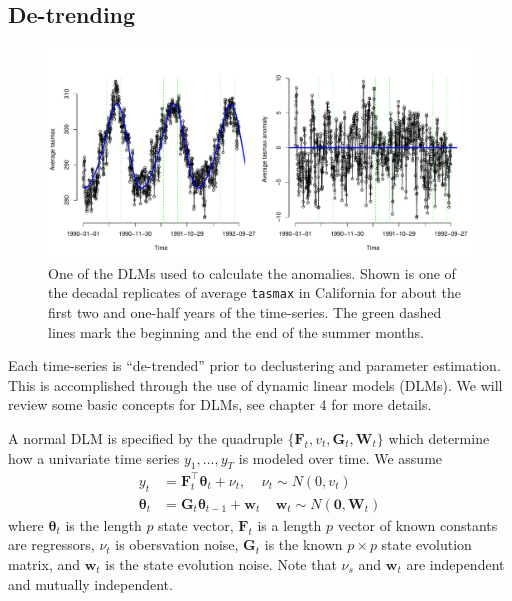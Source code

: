 \documentclass[12pt]{article}
\newcommand{\m}[1]{\mathbf{\bm{#1}}}
\begin{document}
\subsection{De-trending}
\label{anomaly}

\begin{figure}
\begin{center}
\includegraphics[scale=0.50]{figs/dlm.pdf}
\end{center}
\caption{One of the DLMs used to calculate the anomalies. Shown is one of the decadal replicates of average \texttt{tasmax} in California for about the first two and one-half years of the time-series. The green dashed lines mark the beginning and the end of the summer months.}
\label{dlm}
\end{figure}

Each time-series is ``de-trended'' prior to declustering and parameter estimation. This is accomplished through the use of dynamic linear models (DLMs). We will review some basic concepts for DLMs, see \cite{prado2010time} chapter 4 for more details.

A normal DLM is specified by the quadruple $\{\m{F}_t, v_t, \m{G}_t, \m{W}_t\}$ which determine how a univariate time series $y_1,\ldots,y_T$ is modeled over time. We assume
\begin{align}
y_t &= \m{F}_t^\top\m{\theta}_t + \nu_t,~~~~~\nu_t\sim N(0, v_t) \\
\m{\theta}_t &= \m{G}_t\m{\theta}_{t-1}+\m{w}_t~~~~~\m{w}_t\sim N(\m{0}, \m{W}_t)
\end{align}
where $\m{\theta}_t$ is the length $p$ state vector, $\m{F}_t$ is a length $p$ vector of known constants are regressors, $\nu_t$ is obersvation noise, $\m{G}_t$ is the known $p\times p$ state evolution matrix, and $\m{w}_t$ is the state evolution noise. Note that $\nu_s$ and $\m{w}_t$ are independent and mutually independent.
\end{document}
